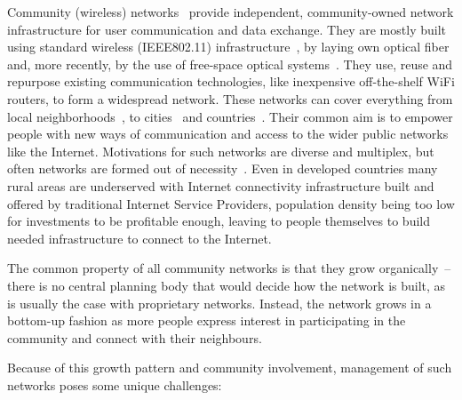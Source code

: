 \documentclass[5p,sort&compress]{elsarticle}
\begin{document}
Community (wireless) networks~\cite{Bruno_2005} provide independent, community-owned network infrastructure for user communication and data exchange.
They are mostly built using standard wireless (IEEE802.11) infrastructure~\cite{Akyildiz_2005}, by laying own optical fiber and, more recently, by the use of free-space optical systems~\cite{Mustafa_2013}.
They use, reuse and repurpose existing communication technologies, like inexpensive off-the-shelf WiFi routers, to form a widespread network.
These networks can cover everything from local neighborhoods~\cite{RedHook_2013}, to cities~\cite{AWMN} and countries~\cite{wlanslovenija_2009, guifi_2003, Funkfeuer_2003, Freifunk_2003}.
Their common aim is to empower people with new ways of communication and access to the wider public networks like the Internet.
Motivations for such networks are diverse and multiplex, but often networks are formed out of necessity~\cite{WNDW_2013}.
Even in developed countries many rural areas are underserved with Internet connectivity infrastructure built and offered by traditional Internet Service Providers, population density being too low for investments to be profitable enough, leaving to people themselves to build needed infrastructure to connect to the Internet.

The common property of all community networks is that they grow organically~-- there is no central planning body that would decide how the network is built, as is usually the case with proprietary networks.
Instead, the network grows in a bottom-up fashion as more people express interest in participating in the community and connect with their neighbours.

Because of this growth pattern and community involvement, management of such networks poses some unique challenges:
\end{document}
